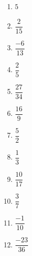 %
%
  \begin{enumerate}[cols=4]
    \item $5$
    \item $\dfrac{2}{15}$
    \item $\dfrac{-6}{13}$
    \item $\dfrac{2}{5}$
    \item $\dfrac{27}{34}$
    \item $\dfrac{16}{9}$
    \item $\dfrac{5}{2}$
    \item $\dfrac{1}{3}$
    \item $\dfrac{10}{17}$
    \item $\dfrac{3}{7}$
    \item $\dfrac{-1}{10}$
    \item $\dfrac{-23}{36}$
  \end{enumerate}

